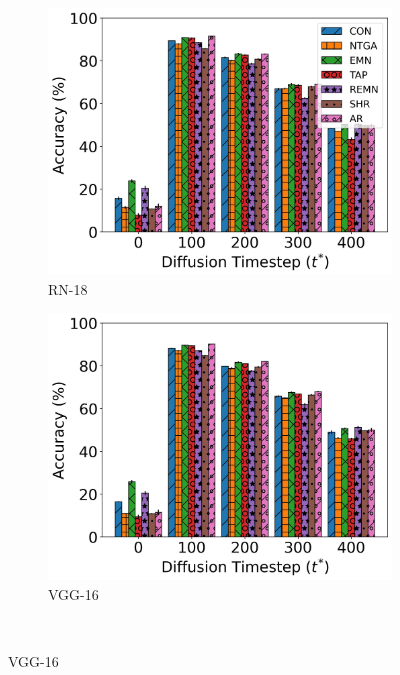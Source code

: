 \documentclass[conference]{IEEEtran}
\theoremstyle{definition}
\theoremstyle{remark}
\theoremstyle{proposition}
\begin{document}
\begin{figure}[tb!]
	\centering
	\begin{subfigure}{.375\textwidth}
		\centering
		\includegraphics[width=1.0\textwidth]{RN-18_ACC_T_CIFAR-10.jpg}
		\caption{RN-18}
		\label{fig:timestep_ext:rn18}
	\end{subfigure}\hspace*{2em}
	\begin{subfigure}{.375\textwidth}
		\centering
		\includegraphics[width=1.0\textwidth]{VGG-16_ACC_T_CIFAR-10.jpg}
		\caption{VGG-16}
		\label{fig:timestep_ext:vgg16}
	\end{subfigure}\\

\end{figure}
\end{document}
